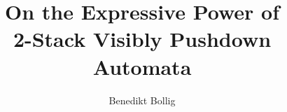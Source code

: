 \documentclass{LMCS}
\begin{document}
\newtheorem{myclaim}[thm]{Claim}{\bfseries}{\rmfamily}


\renewcommand{\arraystretch}{1.4}


\newcommand{\state}{\sphere}
\newcommand{\cstate}{\sphere_c}

\newcommand{\Buchi}{B{\"u}chi\xspace}

\newcommand{\AllSpheres}{\mathit{Spheres}}
\newcommand{\Spheres}{\mathit{Spheres}}

\newcommand{\AlleSpheres}{\mathit{eSpheres}}

\newcommand{\core}{\mathit{core}}
\newcommand{\espheremap}{\mathit{esphere}}
\newcommand{\labeling}{\mathit{label}}
\newcommand{\inst}{\mathit{col}}
\newcommand{\col}{\mathit{col}}
\newcommand{\const}{\#\mathit{Col}}

\newcommand{\State}{\mathcal{E}}
\newcommand{\cState}{\mathcal{E}_c}


\newcommand{\tW}{{\widetilde{W}}}
\newcommand{\tn}{\widetilde{n}}
\newcommand{\tsuccord}{\widetilde{\succord}}
\newcommand{\tmu}{\widetilde{\mu}}
\newcommand{\tlambda}{\widetilde{\lambda}}
\newcommand{\trho}{\widetilde{\rho}}

\newcommand{\maxN}{\mathit{maxSize}(r)}

\newcommand{\Dir}{\Delta}


\newcommand{\Wleadsto}[4]{#3 \mathrel{{\xhookrightarrow{#2~}}_{#1}} #4}
\newcommand{\Wleadstoeq}[4]{#3 \mathrel{{\xRightarrow{~#2~}}_{#1}} #4}
\newcommand{\longWleadstoeq}[4]{#3 \mathrel{{\xRightarrow{#2~}}_{#1}} #4}

\newcommand{\eWleadsto}[5]{#3 \mathrel{{\xhookrightarrow[{#5}]{#2}}}
#4}



\newcommand{\Paths}{\mathit{Paths}}


\title[On the Expressive Power of 2-Stack Visibly Pushdown Automata]{On
  the Expressive Power of\\2-Stack Visibly Pushdown Automata}

\author[B.~Bollig]{Benedikt Bollig}
 \address{LSV, ENS Cachan, CNRS ---
   61, avenue du Pr{\'e}sident Wilson,
   94235 Cachan Cedex, France}

 
\end{document}
